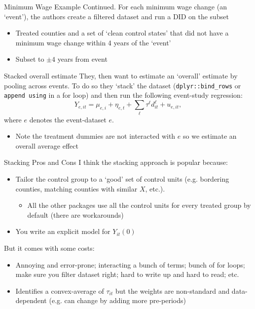 \documentclass[t]{beamer}
\begin{document}
\begin{frame}{Minimum Wage Example Continued.}
  \bigskip
  For each minimum wage change (an `event'), the authors create a filtered dataset and run a DID on the subset
  \begin{itemize}
    \item Treated counties and a set of `clean control states' that did not have a minimum wage change within 4 years of the `event'
    \item Subset to $\pm 4$ years from event
  \end{itemize}
\end{frame}


\begin{frame}{Stacked overall estimate}
  They, then want to estimate an `overall' estimate by pooling across events. To do so they `stack' the dataset (\texttt{dplyr::bind\_rows} or \texttt{append using} in a for loop) and then run the following event-study regression:
  $$
    Y_{e,it} = \mu_{e,i} + \eta_{e,t} + \sum_{\ell} \tau^\ell d_{it}^\ell + u_{e,it},
  $$
  where $e$ denotes the event-dataset $e$.
  \begin{itemize}
    \item Note the treatment dummies are not interacted with $e$ so we estimate an overall average effect
  \end{itemize}
\end{frame}

\begin{frame}{Stacking Pros and Cons}
  I think the stacking approach is popular because:
  \begin{itemize}
    \item Tailor the control group to a `good' set of control units (e.g. bordering counties, matching counties with similar $X$, etc.).
    \begin{itemize}
      \item All the other packages use all the control units for every treated group by default (there are workarounds)
    \end{itemize}

    \item You write an explicit model for $Y_{it}(0)$
  \end{itemize}

  \bigskip
  But it comes with some costs:
  \begin{itemize}
    \item Annoying and error-prone; interacting a bunch of terms; bunch of for loops; make sure you filter dataset right; hard to write up and hard to read; etc.
    \item Identifies a convex-average of $\tau_{it}$ but the weights are non-standard and data-dependent (e.g. can change by adding more pre-periods)
  \end{itemize}
\end{frame}
\end{document}
